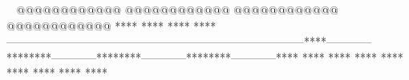     @@@@@@@@@@@@        @@@@@@@@@@@@        @@@@@@@@@@@@        @@@@@@@@@@@@            ****                ****                ****                ****        --------------------------------------------------------------------------------****------------********------------********------------********------------****    ****    ****        ****    ****        ****    ****        ****    ****     